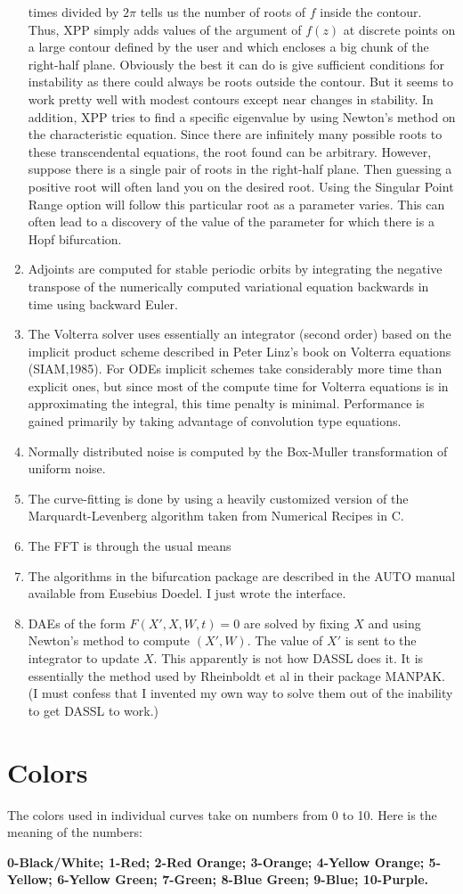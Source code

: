 \documentclass{article}
\begin{document}
\begin{enumerate}
times divided by $2\pi$ tells us the number of roots of $f$ inside the
contour. Thus, XPP simply adds values of the argument of $f(z)$ at
discrete points on a large contour defined by the user and which
encloses a big chunk of the right-half plane.  Obviously the best it
can do is give sufficient conditions for instability as there could
always be roots outside the contour. But it seems to work pretty well
with modest contours except near changes in stability. In addition,
XPP tries to find a specific eigenvalue by using Newton's method on
the characteristic equation. Since there are infinitely many possible
roots to these transcendental equations, the root found can be
arbitrary. However, suppose there is a single pair of roots in the
right-half plane. Then guessing a positive root will often land you on
the desired root. Using the Singular Point Range option will follow
this particular root as a parameter varies. This can often lead to a
discovery of the value of the parameter for which there is a Hopf
bifurcation.


\item Adjoints are computed for stable periodic
 orbits by integrating the negative transpose of the numerically computed
 variational equation backwards in time using backward Euler.

\item The Volterra solver uses essentially an integrator (second order)
based on the implicit product scheme described in Peter Linz's book on
Volterra equations (SIAM,1985). For ODEs implicit schemes take
considerably more time than explicit ones, but since most of the
compute time for Volterra equations is in approximating the integral,
this time penalty is minimal.  Performance is gained primarily by
taking advantage of convolution type equations.

\item Normally distributed noise is computed by the Box-Muller
transformation of uniform noise.
\item The curve-fitting is done by using a heavily customized version
of the Marquardt-Levenberg algorithm taken from Numerical Recipes in
C.
\item The FFT is through the usual means
\item The algorithms in the bifurcation package are described in the
AUTO manual available from Eusebius Doedel.  I just wrote the
interface.
\item DAEs of the form $F(X',X,W,t)=0$ are solved by fixing $X$ and
using Newton's method to compute $(X',W)$.  The value of $X'$ is sent
to the integrator to update $X.$  This apparently is not how DASSL
does it.  It is essentially the method used by Rheinboldt et al in
their package MANPAK. (I must confess that I invented my own way to
solve them out of the inability to get DASSL to work.)
\end{enumerate}

\section{Colors}
The colors used in individual curves take on numbers from 0 to 10. Here is
the meaning of the numbers:

{\bf 0-Black/White; 1-Red; 2-Red Orange; 3-Orange;
4-Yellow Orange; 5-Yellow; 6-Yellow Green; 7-Green; 8-Blue Green; 9-Blue;
10-Purple.}
\end{document}
